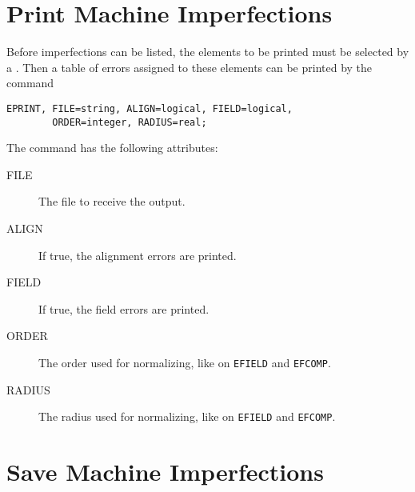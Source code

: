 \section{Print Machine Imperfections}
\label{sec:errorprint}

Before imperfections can be listed, 
the elements to be printed must be selected by a
.
Then a table of errors assigned to these elements can be printed 
by the command
\begin{verbatim}
EPRINT, FILE=string, ALIGN=logical, FIELD=logical,
        ORDER=integer, RADIUS=real;
\end{verbatim}
The command has the following attributes:
\begin{description}
\item[FILE]
  The file to receive the output.
\item[ALIGN]
  If true, the alignment errors are printed.
\item[FIELD]
  If true, the field errors are printed.
\item[ORDER]
  The order used for normalizing, like on \texttt{EFIELD} and
  \texttt{EFCOMP}. 
\item[RADIUS]
  The radius used for normalizing, like on \texttt{EFIELD} and
  \texttt{EFCOMP}.
\end{description}

\section{Save Machine Imperfections}
\label{sec:errorsave}

